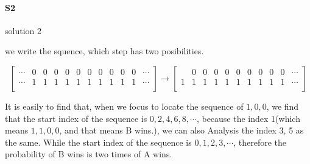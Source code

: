 \documentclass[UTF8]{../09-Mathematics}
\begin{document}
\paragraph{S2} solution 2


we write the squence, which step has two posibilities. 
\addtocounter{MaxMatrixCols}{10}
\begin{equation}
    \begin{bmatrix}
\cdots & 0 & 0 & 0 & 0& 0& 0& 0& 0& 0& 0 & \cdots \\
\cdots & 1 & 1& 1& 1& 1& 1& 1& 1& 1& 1&\cdots \\
     \end{bmatrix}
     \longrightarrow
    \begin{bmatrix}
          & 0 & 0 & 0& 0& 0& 0& 0& 0& 0 & \cdots \\
         1 & 1& 1& 1& 1& 1& 1& 1& 1& 1&\cdots \\
    \end{bmatrix}
\end{equation}

It is easily to find that, when we focus to locate the sequence of ${1,0,0}$, we find that the start index of the sequence is ${0, 2,4,6,8, \cdots}$, because the index 1(which means $1,1,0,0$, and that means B wins.), we can also Analysis the index 3, 5 as the same. While the start index of the sequence is ${0,1, 2,3, \cdots}$, therefore the probability of B wins is two times of A wins.
\end{document}

